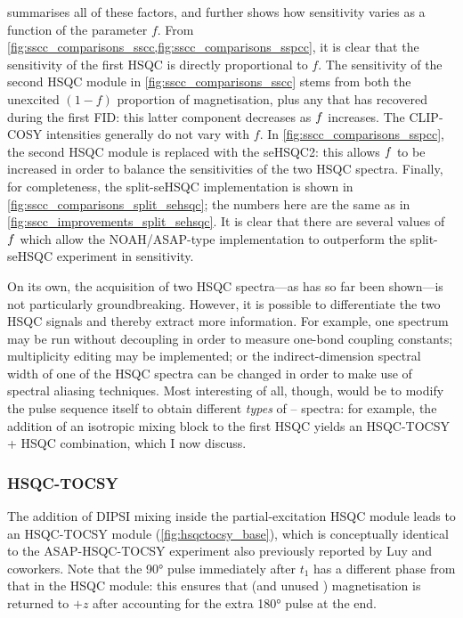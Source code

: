  summarises all of these factors, and further shows how sensitivity varies as a function of the parameter $f$.
From \cref{fig:sscc_comparisons_sscc,fig:sscc_comparisons_sspcc}, it is clear that the sensitivity of the first HSQC is directly proportional to $f$.
The sensitivity of the second HSQC module in \cref{fig:sscc_comparisons_sscc} stems from both the unexcited $(1 - f)$ proportion of  magnetisation, plus any that has recovered during the first FID: this latter component decreases as $f\/$ increases.
The CLIP-COSY intensities generally do not vary with $f$.
In \cref{fig:sscc_comparisons_sspcc}, the second HSQC module is replaced with the seHSQC2: this allows $f\/$ to be increased in order to balance the sensitivities of the two HSQC spectra.
Finally, for completeness, the split-seHSQC implementation is shown in \cref{fig:sscc_comparisons_split_sehsqc}; the numbers here are the same as in \cref{fig:sscc_improvements_split_sehsqc}.
It is clear that there are several values of $f\/$ which allow the NOAH/ASAP-type implementation to outperform the split-seHSQC experiment in sensitivity.

On its own, the acquisition of two HSQC spectra---as has so far been shown---is not particularly groundbreaking.
However, it is possible to differentiate the two HSQC signals and thereby extract more information.
For example, one spectrum may be run without decoupling in order to measure one-bond coupling constants\autocite{Enthart2008JMR,Nolis2019CPC}; multiplicity editing may be implemented\autocite{SchulzeSunninghausen2017JMR}; or the indirect-dimension spectral width of one of the HSQC spectra can be changed in order to make use of spectral aliasing techniques\autocite{Nolis2019JMR,Jeannerat2011eMR}.
Most interesting of all, though, would be to modify the pulse sequence itself to obtain different \textit{types} of \proton{}--\carbon{} spectra: for example, the addition of an isotropic mixing block to the first HSQC yields an HSQC-TOCSY + HSQC combination\autocite{Nolis2019CPC}, which I now discuss.


\subsubsection{HSQC-TOCSY}

The addition of DIPSI mixing inside the partial-excitation HSQC module leads to an HSQC-TOCSY module (\cref{fig:hsqctocsy_base}), which is conceptually identical to the ASAP-HSQC-TOCSY experiment also previously reported by Luy and coworkers\autocite{Becker2019JMR}.
Note that the \proton{} \ang{90} pulse immediately after $t_1$ has a different phase from that in the HSQC module: this ensures that  (and unused ) magnetisation is returned to $+z$ after accounting for the extra \ang{180} pulse at the end.

